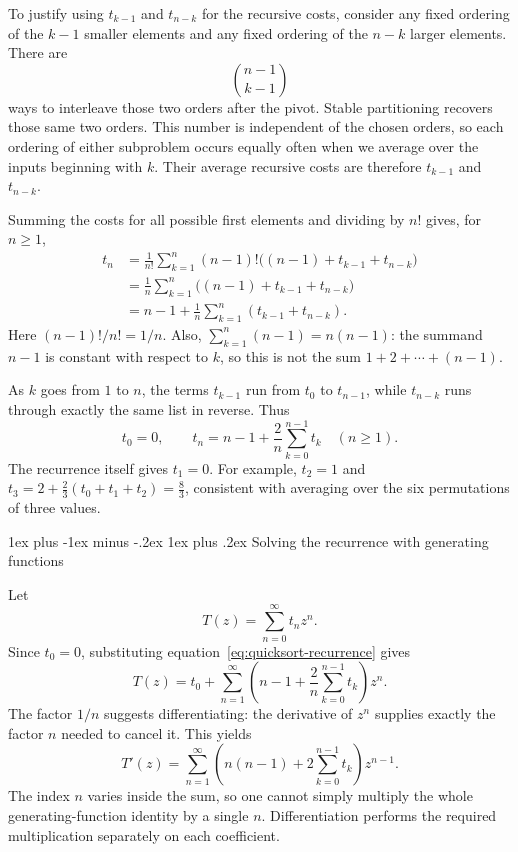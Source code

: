 \documentclass[11pt]{article}
\makeatletter
\renewcommand{\subsection}{\@startsection{subsection}{2}{0mm}%
                                     {1ex plus -1ex minus -.2ex}%
                                     {1ex plus .2ex}%
                                     {\normalfont\large\bfseries}}%
\makeatother
\begin{document}
To justify using $t_{k-1}$ and $t_{n-k}$ for the recursive costs, consider any
fixed ordering of the $k-1$ smaller elements and any fixed ordering of the
$n-k$ larger elements. There are
\[
 \binom{n-1}{k-1}
\]
ways to interleave those two orders after the pivot. Stable partitioning
recovers those same two orders. This number is independent of the chosen
orders, so each ordering of either subproblem occurs equally often when we
average over the inputs beginning with $k$. Their average recursive costs are
therefore $t_{k-1}$ and $t_{n-k}$.

Summing the costs for all possible first elements and dividing by $n!$ gives,
for $n\geq1$,
\begin{align*}
 t_n
 &=\frac{1}{n!}\sum_{k=1}^{n}(n-1)!
       \bigl((n-1)+t_{k-1}+t_{n-k}\bigr)\\
 &=\frac{1}{n}\sum_{k=1}^{n}
       \bigl((n-1)+t_{k-1}+t_{n-k}\bigr)\\
 &=n-1+\frac{1}{n}\sum_{k=1}^{n}(t_{k-1}+t_{n-k}).
\end{align*}
Here $(n-1)!/n!=1/n$. Also, $\sum_{k=1}^{n}(n-1)=n(n-1)$:
the summand $n-1$ is constant with respect to $k$, so this is not the
sum $1+2+\cdots+(n-1)$.

As $k$ goes from $1$ to $n$, the terms $t_{k-1}$ run from $t_0$ to $t_{n-1}$,
while $t_{n-k}$ runs through exactly the same list in reverse. Thus
\begin{equation}
 \boxed{t_0=0,\qquad
 t_n=n-1+\frac{2}{n}\sum_{k=0}^{n-1}t_k\quad(n\geq1).}
 \label{eq:quicksort-recurrence}
\end{equation}
The recurrence itself gives $t_1=0$. For example, $t_2=1$ and
$t_3=2+\frac23(t_0+t_1+t_2)=\frac83$, consistent with averaging over the
six permutations of three values.

\subsection{Solving the recurrence with generating functions}

Let
\[
 T(z)=\sum_{n=0}^{\infty}t_nz^n.
\]
Since $t_0=0$, substituting equation~\eqref{eq:quicksort-recurrence} gives
\[
 T(z)=t_0+\sum_{n=1}^{\infty}
       \left(n-1+\frac{2}{n}\sum_{k=0}^{n-1}t_k\right)z^n.
\]
The factor $1/n$ suggests differentiating: the derivative of $z^n$ supplies
exactly the factor $n$ needed to cancel it. This yields
\begin{equation}
 T'(z)=\sum_{n=1}^{\infty}
       \left(n(n-1)+2\sum_{k=0}^{n-1}t_k\right)z^{n-1}.
 \label{eq:quicksort-derivative}
\end{equation}
The index $n$ varies inside the sum, so one cannot simply multiply the whole
generating-function identity by a single $n$. Differentiation performs the
required multiplication separately on each coefficient.
\end{document}
